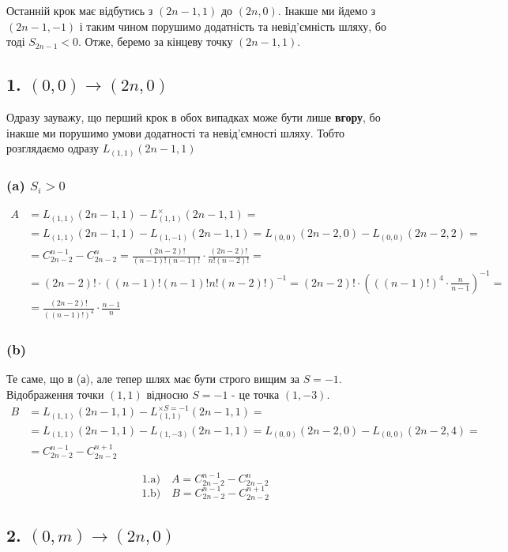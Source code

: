 Останній крок має відбутись з $(2n-1,1)$ до $(2n,0)$. 
Інакше ми йдемо з $(2n-1,-1)$ і таким чином порушимо додатність та невід'ємність шляху, 
бо тоді $S_{2n-1}<0$. 
Отже, беремо за кінцеву точку $(2n-1,1)$. 

\subsection*{1. $(0,0) \to (2n,0)$}
Одразу зауважу, що перший крок в обох випадках може бути лише \textbf{вгору}, 
бо інакше ми порушимо умови додатності та невід'ємності шляху.
Тобто розглядаємо одразу $L_{(1,1)}(2n-1,1)$

\subsubsection*{(a) $S_i > 0$}
\begin{align*}
A &= L_{(1,1)}(2n-1,1) - L^{\times}_{(1,1)}(2n-1,1) = \\
&= L_{(1,1)}(2n-1,1) - L_{(1,-1)}(2n-1,1)
= L_{(0,0)}(2n-2,0) - L_{(0,0)}(2n-2,2) = \\
&= C_{2n-2}^{n-1} - C_{2n-2}^{n} 
= \frac{(2n-2)!}{(n-1)!(n-1)!} \cdot \frac{(2n-2)!}{n!(n-2)!} =\\
&= (2n-2)! \cdot ( (n-1)!(n-1)!n!(n-2)! )^{-1} = 
(2n-2)! \cdot \left( ((n-1)!)^4 \cdot \frac{n}{n-1} \right)^{-1} = \\
&= \frac{(2n-2)!}{((n-1)!)^4} \cdot \frac{n-1}{n}
\end{align*}

\subsubsection*{(b)}
Те саме, що в (а), але тепер шлях має бути строго вищим за $S=-1$.
Відображення точки $(1,1)$ відносно $S=-1$ - це точка $(1,-3)$.
\begin{align*}
	B &= L_{(1,1)}(2n-1,1) - L^{\times S=-1}_{(1,1)}(2n-1,1) = \\
	&= L_{(1,1)}(2n-1,1) - L_{(1,-3)}(2n-1,1)
	= L_{(0,0)}(2n-2,0) - L_{(0,0)}(2n-2,4) = \\
	&= C_{2n-2}^{n-1} - C_{2n-2}^{n+1} 
\end{align*}

\begin{mdframed}[style=ans]
	$$\text{1.a)}\quad A = C_{2n-2}^{n-1} - C_{2n-2}^{n}$$
	$$\text{1.b)}\quad B = C_{2n-2}^{n-1} - C_{2n-2}^{n+1}$$
\end{mdframed}


\subsection*{2. $(0,m) \to (2n,0)$}

